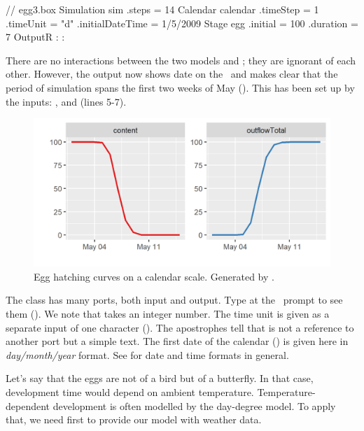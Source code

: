 \lstset{numbers=left}
\begin{boxscript}
// egg3.box
Simulation sim {
  .steps = 14
  Calendar calendar {
    .timeStep = 1
    .timeUnit = "d"
    .initialDateTime = 1/5/2009
  }
  Stage egg {
    .initial = 100 
    .duration = 7
  }
  OutputR {
:
:
  }
}
\end{boxscript}
\lstset{numbers=none}

There are no interactions between the two models  and ; they are ignorant of each other. However, the output now shows date on the \xaxis\ and makes clear that the period of simulation spans the first two weeks of May (). This has been set up by the  inputs: ,  and  (lines 5-7). 

\begin{figure}
\centering
\includegraphics{graphics/egg3}
\caption{Egg hatching curves on a calendar scale. Generated by .}
\label{fig:egg3}
\end{figure}

The  class has many ports, both input and output. Type  at the \US\ prompt to see them (). We note that  takes an integer number. The time unit is given as a separate input of one character (). The apostrophes tell that  is not a  reference to another port but a simple text. The first date of the calendar () is given here in \textit{day/month/year} format. See  for date and time formats in general.

Let's say that the eggs are not of a bird but of a butterfly. In that case, development time would depend on ambient temperature. Temperature-dependent development is often modelled by the day-degree model. To apply that, we need first to provide our model with weather data.

